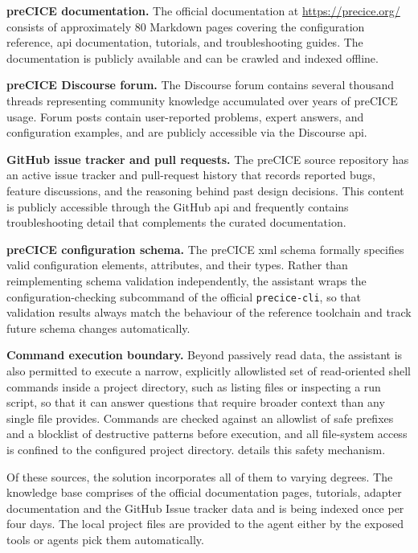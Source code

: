 \documentclass[
  numbers=noenddot,
  english,
  a4paper,
  twoside,
  bibliography=totoc,
  headsepline,
  cleardoublepage=empty,
  parskip=half,
  draft=false
]{scrbook}
\theoremstyle{break}
\renewcommand{\_}{\textunderscore\allowbreak}
\begin{document}
\noindent\textbf{preCICE documentation.} The official documentation at \url{https://precice.org/}
consists of approximately 80 Markdown pages covering the configuration reference, \gls{api}
documentation, tutorials, and troubleshooting guides. The documentation is publicly available
and can be crawled and indexed offline.

\noindent\textbf{preCICE Discourse forum.} The Discourse forum contains several thousand
threads representing community knowledge accumulated over years of preCICE usage. Forum
posts contain user-reported problems, expert answers, and configuration examples, and are
publicly accessible via the Discourse \gls{api}.

\noindent\textbf{GitHub issue tracker and pull requests.} The preCICE source repository has
an active issue tracker and pull-request history that records reported bugs, feature
discussions, and the reasoning behind past design decisions. This content is publicly accessible
through the GitHub \gls{api} and frequently contains troubleshooting detail that complements
the curated documentation.

\noindent\textbf{preCICE configuration schema.} The preCICE \gls{xml} schema formally
specifies valid configuration elements, attributes, and their types. Rather than reimplementing
schema validation independently, the assistant wraps the configuration-checking subcommand
of the official \texttt{precice-cli}, so that validation results always match the behaviour of
the reference toolchain and track future schema changes automatically.

\noindent\textbf{Command execution boundary.} Beyond passively read data, the assistant is
also permitted to execute a narrow, explicitly allowlisted set of read-oriented shell commands
inside a project directory, such as listing files or inspecting a run script, so that it can
answer questions that require broader context than any single file provides. Commands are
checked against an allowlist of safe prefixes and a blocklist of destructive patterns before
execution, and all file-system access is confined to the configured project directory.
 details this safety mechanism.

Of these sources, the solution incorporates all of them to varying degrees. The knowledge base 
comprises of the official documentation pages, tutorials, adapter documentation and the GitHub
Issue tracker data and is being indexed once per four days. The local project files are provided to 
the agent either by the exposed tools or agents pick them automatically.
\end{document}
